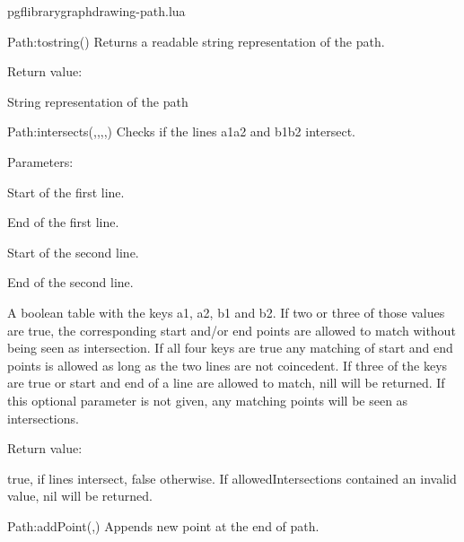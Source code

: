 
\begin{filedescription}{pgflibrarygraphdrawing-path.lua}


\begin{luacommand}{{Path:\textunderscore{}\textunderscore{}tostring}()}
Returns a readable string representation of the path.


Return value:
\begin{parameterdescription} 
  \item[] String representation of the path
\end{parameterdescription}


\end{luacommand}
\begin{luacommand}{{Path:\textunderscore{}intersects}(,,,,)}
Checks if the lines a1a2 and b1b2 intersect.

Parameters:
\begin{parameterdescription}
	\item[\meta{a1}] Start of the first line.\item[\meta{a2}] End of the first line.\item[\meta{b1}] Start of the second line.\item[\meta{b2}] End of the second line.\item[\meta{allowedIntersections}] A boolean table with the keys a1, a2, b1 and b2. If two or three of those values are true, the corresponding start and/or end points are allowed to match without being seen as intersection. If all four keys are true any matching of start and end points is allowed as long as the two lines are not coincedent. If three of the keys are true or start and end of a line are allowed to match, nill will be returned. If this optional parameter is not given, any matching points will be seen as intersections.
\end{parameterdescription}


Return value:
\begin{parameterdescription} 
  \item[] true, if lines intersect, false otherwise. If allowedIntersections contained an invalid value, nil will be returned.
\end{parameterdescription}


\end{luacommand}
\begin{luacommand}{{Path:addPoint}(,)}
Appends new point at the end of path.


\end{luacommand}
\end{filedescription}
